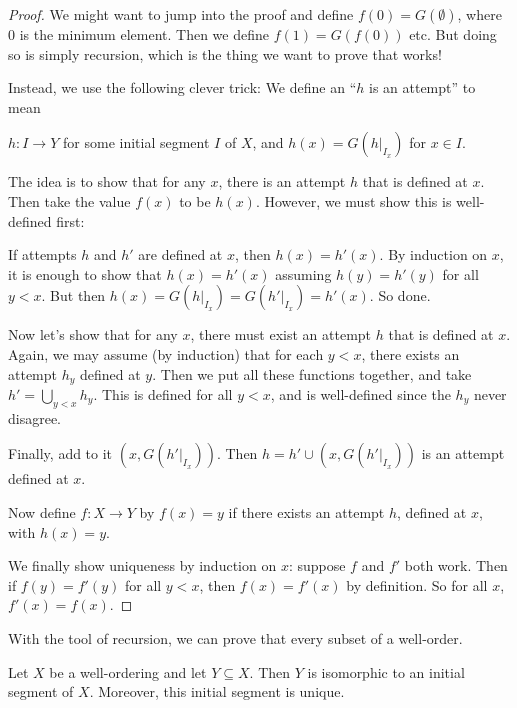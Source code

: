 \documentclass[a4paper]{article}
\begin{document}
\begin{proof}
  We might want to jump into the proof and define $f(0) = G(\emptyset)$, where $0$ is the minimum element. Then we define $f(1) = G(f(0))$ etc. But doing so is simply recursion, which is the thing we want to prove that works!

  Instead, we use the following clever trick: We define an ``$h$ is an attempt'' to mean
  \begin{center}
    $h: I \to Y$ for some initial segment $I$ of $X$, and $h(x) = G(h|_{I_x})$ for $x\in I$.
  \end{center}
  The idea is to show that for any $x$, there is an attempt $h$ that is defined at $x$. Then take the value $f(x)$ to be $h(x)$. However, we must show this is well-defined first:

  If attempts $h$ and $h'$ are defined at $x$, then $h(x) = h'(x)$. By induction on $x$, it is enough to show that $h(x) = h'(x)$ assuming $h(y) = h'(y)$ for all $y < x$. But then $h(x) = G(h|_{I_x}) = G(h'|_{I_x}) = h'(x)$. So done.

  Now let's show that for any $x$, there must exist an attempt $h$ that is defined at $x$. Again, we may assume (by induction) that for each $y < x$, there exists an attempt $h_y$ defined at $y$. Then we put all these functions together, and take $h' = \bigcup_{y < x} h_y$. This is defined for all $y < x$, and is well-defined since the $h_y$ never disagree.

  Finally, add to it $(x, G(h'|_{I_x}))$. Then $h = h'\cup (x, G(h'|_{I_x}))$ is an attempt defined at $x$.

  Now define $f:X\to Y$ by $f(x) = y$ if there exists an attempt $h$, defined at $x$, with $h(x) = y$.

  We finally show uniqueness by induction on $x$: suppose $f$ and $f'$ both work. Then if $f(y) = f'(y)$ for all $y < x$, then $f(x) = f'(x)$ by definition. So for all $x$, $f'(x) = f(x)$.
\end{proof}
With the tool of recursion, we can prove that every subset of a well-order.

\begin{prop}
  Let $X$ be a well-ordering and let $Y\subseteq X$. Then $Y$ is isomorphic to an initial segment of $X$. Moreover, this initial segment is unique.
\end{prop}
\end{document}
